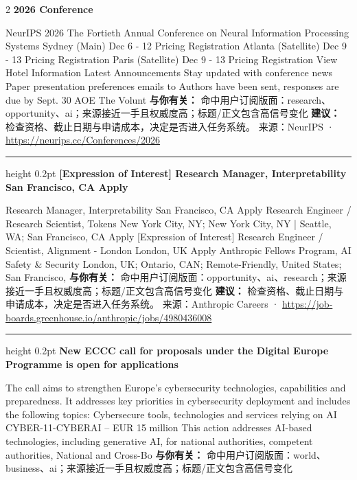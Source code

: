 \documentclass[10.5pt]{ctexart}
\begin{document}
\begin{multicols}{2}
{\large\bfseries 2026 Conference}\par
NeurIPS 2026 The Fortieth Annual Conference on Neural Information Processing Systems Sydney (Main) Dec 6 - 12 Pricing Registration Atlanta (Satellite) Dec 9 - 13 Pricing Registration Paris (Satellite) Dec 9 - 13 Pricing Registration View Hotel Information Latest Announcements Stay updated with conference news Paper presentation preferences emails to Authors have been sent, responses are due by Sept. 30 AOE The Volunt
\textbf{与你有关：} 命中用户订阅版面：research、opportunity、ai；来源接近一手且权威度高；标题/正文包含高信号变化
\textbf{建议：} 检查资格、截止日期与申请成本，决定是否进入任务系统。
{\footnotesize\color{ormuted} 来源：NeurIPS · \url{https://neurips.cc/Conferences/2026}}
\vspace{2mm}
\hrule height 0.2pt
\vspace{2mm}
{\large\bfseries [Expression of Interest] Research Manager, Interpretability San Francisco, CA Apply}\par
[Expression of Interest] Research Manager, Interpretability San Francisco, CA Apply Research Engineer / Research Scientist, Tokens New York City, NY; New York City, NY | Seattle, WA; San Francisco, CA Apply [Expression of Interest] Research Engineer / Scientist, Alignment - London London, UK Apply Anthropic Fellows Program, AI Safety \& Security London, UK; Ontario, CAN; Remote-Friendly, United States; San Francisco, 
\textbf{与你有关：} 命中用户订阅版面：opportunity、ai、research；来源接近一手且权威度高；标题/正文包含高信号变化
\textbf{建议：} 检查资格、截止日期与申请成本，决定是否进入任务系统。
{\footnotesize\color{ormuted} 来源：Anthropic Careers · \url{https://job-boards.greenhouse.io/anthropic/jobs/4980436008}}
\vspace{2mm}
\hrule height 0.2pt
\vspace{2mm}
{\large\bfseries New ECCC call for proposals under the Digital Europe Programme is open for applications}\par
The call aims to strengthen Europe’s cybersecurity technologies, capabilities and preparedness. It addresses key priorities in cybersecurity deployment and includes the following topics: Cybersecure tools, technologies and services relying on AI CYBER-11-CYBERAI – EUR 15 million This action addresses AI-based technologies, including generative AI, for national authorities, competent authorities, National and Cross-Bo
\textbf{与你有关：} 命中用户订阅版面：world、business、ai；来源接近一手且权威度高；标题/正文包含高信号变化

\end{multicols}
\end{document}
